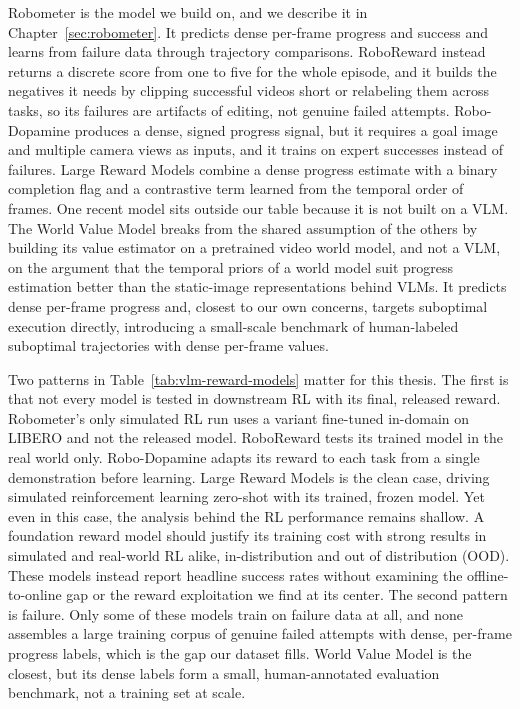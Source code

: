 Robometer \citep{robometer} is the model we build on, and we describe it in Chapter~\ref{sec:robometer}. It predicts dense per-frame progress and success and learns from failure data through trajectory comparisons. RoboReward \citep{roboreward} instead returns a discrete score from one to five for the whole episode, and it builds the negatives it needs by clipping successful videos short or relabeling them across tasks, so its failures are artifacts of editing, not genuine failed attempts. Robo-Dopamine \citep{robodopamine} produces a dense, signed progress signal, but it requires a goal image and multiple camera views as inputs, and it trains on expert successes instead of failures. Large Reward Models \citep{TRI-reward-model} combine a dense progress estimate with a binary completion flag and a contrastive term learned from the temporal order of frames. One recent model sits outside our table because it is not built on a VLM. The World Value Model \citep{wang_world_2026} breaks from the shared assumption of the others by building its value estimator on a pretrained video world model, and not a VLM, on the argument that the temporal priors of a world model suit progress estimation better than the static-image representations behind VLMs. It predicts dense per-frame progress and, closest to our own concerns, targets suboptimal execution directly, introducing a small-scale benchmark of human-labeled suboptimal trajectories with dense per-frame values.

Two patterns in Table~\ref{tab:vlm-reward-models} matter for this thesis. The first is that not every model is tested in downstream RL with its final, released reward. Robometer's only simulated RL run uses a variant fine-tuned in-domain on LIBERO and not the released model. RoboReward tests its trained model in the real world only. Robo-Dopamine adapts its reward to each task from a single demonstration before learning. Large Reward Models is the clean case, driving simulated reinforcement learning zero-shot with its trained, frozen model. Yet even in this case, the analysis behind the RL performance remains shallow. A foundation reward model should justify its training cost with strong results in simulated and real-world RL alike, in-distribution and out of distribution (OOD). These models instead report headline success rates without examining the offline-to-online gap or the reward exploitation we find at its center. The second pattern is failure. Only some of these models train on failure data at all, and none assembles a large training corpus of genuine failed attempts with dense, per-frame progress labels, which is the gap our dataset fills. World Value Model is the closest, but its dense labels form a small, human-annotated evaluation benchmark, not a training set at scale.

